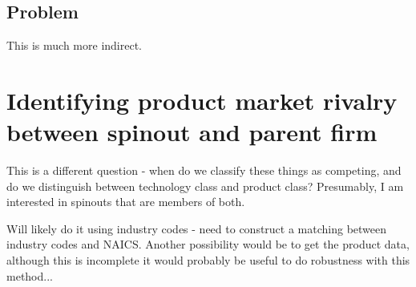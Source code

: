 \documentclass[11pt,english]{article}
\theoremstyle{remark}
\begin{document}
\subsection{Problem}
This is much more indirect.

\section{Identifying product market rivalry between spinout and parent firm}

This is a different question - when do we classify these things as competing, and do we distinguish between technology class and product class? Presumably, I am interested in spinouts that are members of both. 

Will likely do it using industry codes - need to construct a matching between industry codes and NAICS. Another possibility would be to get the product data, although this is incomplete it would probably be useful to do robustness with this method...
\end{document}
